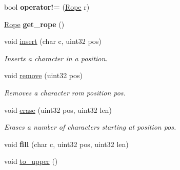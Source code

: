 \begin{DoxyCompactItemize}
\item 
\hypertarget{classetk_1_1_static_string_ab91fc0104f2fc206bd62249d4364f205}{bool {\bfseries operator!=} (\hyperlink{classetk_1_1_rope}{Rope} r)}\label{classetk_1_1_static_string_ab91fc0104f2fc206bd62249d4364f205}

\item 
\hypertarget{classetk_1_1_static_string_a154223efd5135ba6ea4e553494d88753}{\hyperlink{classetk_1_1_rope}{Rope} {\bfseries get\-\_\-rope} ()}\label{classetk_1_1_static_string_a154223efd5135ba6ea4e553494d88753}

\item 
\hypertarget{classetk_1_1_static_string_af33799da9ffff7ea36a26e8323f7a01a}{void \hyperlink{classetk_1_1_static_string_af33799da9ffff7ea36a26e8323f7a01a}{insert} (char c, uint32 pos)}\label{classetk_1_1_static_string_af33799da9ffff7ea36a26e8323f7a01a}

\begin{DoxyCompactList}\small\item\em Inserts a character in a position. \end{DoxyCompactList}\item 
\hypertarget{classetk_1_1_static_string_a9b9c0fc0830278d0fdc7da0735d19d49}{void \hyperlink{classetk_1_1_static_string_a9b9c0fc0830278d0fdc7da0735d19d49}{remove} (uint32 pos)}\label{classetk_1_1_static_string_a9b9c0fc0830278d0fdc7da0735d19d49}

\begin{DoxyCompactList}\small\item\em Removes a character rom position pos. \end{DoxyCompactList}\item 
\hypertarget{classetk_1_1_static_string_aebe736486f4bee17a3baebe58a11561c}{void \hyperlink{classetk_1_1_static_string_aebe736486f4bee17a3baebe58a11561c}{erase} (uint32 pos, uint32 len)}\label{classetk_1_1_static_string_aebe736486f4bee17a3baebe58a11561c}

\begin{DoxyCompactList}\small\item\em Erases a number of characters starting at position pos. \end{DoxyCompactList}\item 
\hypertarget{classetk_1_1_static_string_a6a1ac1c4e3b0388694949c98ee05cf2d}{void {\bfseries fill} (char c, uint32 pos, uint32 len)}\label{classetk_1_1_static_string_a6a1ac1c4e3b0388694949c98ee05cf2d}

\item 
\hypertarget{classetk_1_1_static_string_a1bfd64eb5df0f7162e3ee57542c23ba3}{void \hyperlink{classetk_1_1_static_string_a1bfd64eb5df0f7162e3ee57542c23ba3}{to\-\_\-upper} ()}\label{classetk_1_1_static_string_a1bfd64eb5df0f7162e3ee57542c23ba3}


\end{DoxyCompactItemize}
